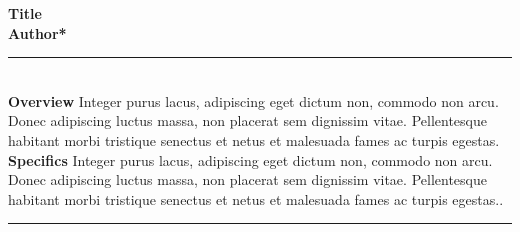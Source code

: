 
\vspace{-2cm}%
\textbf{\Large Title}\\
\textbf{\Large Author*}
\hspace{1in}\vspace{-.7cm}\hspace{1in}\\

\rule{\textwidth}{1pt}\\
	\textbf{Overview} Integer purus lacus, adipiscing eget dictum non, commodo non arcu. Donec adipiscing luctus massa, non placerat sem dignissim vitae. Pellentesque habitant morbi tristique senectus et netus et malesuada fames ac turpis egestas.\\
	\textbf{Specifics} Integer purus lacus, adipiscing eget dictum non, commodo non arcu. Donec adipiscing luctus massa, non placerat sem dignissim vitae. Pellentesque habitant morbi tristique senectus et netus et malesuada fames ac turpis egestas..\\
\rule{\textwidth}{1pt}


\renewcommand{\thefootnote}

{\fnsymbol{footnote}}

\thispagestyle{empty}
\newpage
